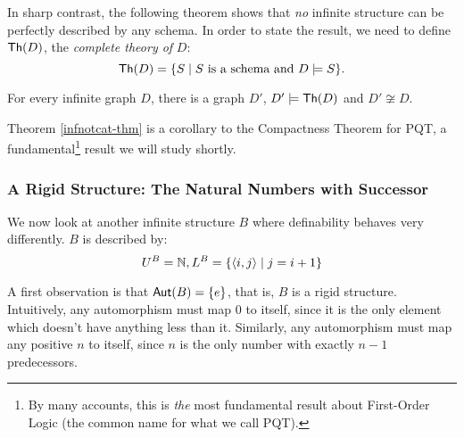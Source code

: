 In sharp contrast, the following theorem shows that \emph{no} infinite structure can be perfectly described by any schema. In order to state the result, we need to define $\mbox{${\mathsf{Th}}(D)$}$, the \emph{complete theory of} $D$:
\[
\mbox{${\mathsf{Th}}(D)$} = \{S\mid S \mbox{ is a schema and } D\models S\}. 
\]
\begin{theorem}\label{infnotcat-thm}
For every infinite graph $D$, there is a graph $D'$, $D'\models\mbox{${\mathsf{Th}}(D)$}$ and $D'\not\cong D$.
\end{theorem}
Theorem \ref{infnotcat-thm} is a corollary to the Compactness Theorem for PQT, a fundamental\footnote{By many accounts, this is \emph{the} most fundamental result about First-Order Logic (the common name for what we call PQT).} result we will study shortly.
\fi
\subsubsection*{A Rigid Structure: The Natural Numbers with Successor}
We now look at another infinite structure $B$ where definability behaves very differently. $B$ is described by:
\[
    U^B = \mathbb{N}, L^B = \{\mbox{$\langle i,j \rangle$}\mid j=i+1\}
\]

\begin{center}
\end{center}

A first observation is that $\mbox{$\mathsf{Aut}(B)$}=\{e\}$, that is, $B$ is a rigid structure. Intuitively, any automorphism must map $0$ to itself, since it is the only element which doesn't have anything less than it. Similarly, any automorphism must map any positive $n$ to itself, since $n$ is the only number with exactly $n - 1$ predecessors. 

